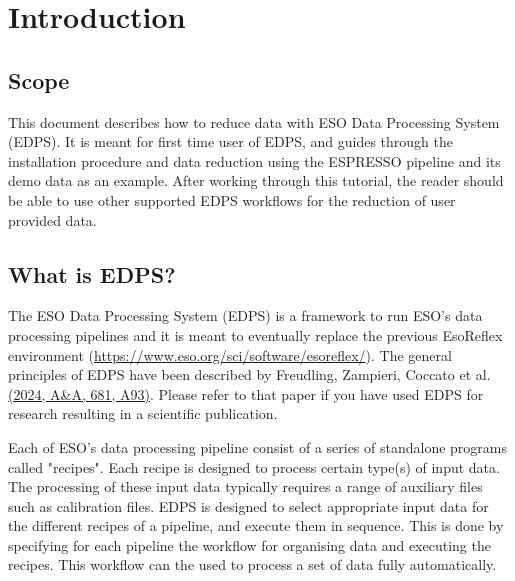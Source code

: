 \section{Introduction}
\subsection{Scope}

This document describes how to reduce data with ESO Data Processing System (EDPS). It is meant for first time user of EDPS, and guides through the installation procedure and data reduction using the ESPRESSO pipeline and its demo data as an example. After working through this tutorial, the reader should be able to use  other supported EDPS workflows for the reduction of user provided data.

\subsection{What is EDPS?}

The ESO Data Processing System (EDPS) is a framework  to  run ESO's data processing pipelines and it is meant to eventually replace the previous EsoReflex environment (\url{https://www.eso.org/sci/software/esoreflex/}). The general principles of EDPS have been described by Freudling, Zampieri, Coccato et al. \href{https://www.aanda.org/articles/aa/full_html/2024/01/aa47651-23/aa47651-23.html}{(2024, A\&A, 681, A93)}. Please refer to that paper if you have used EDPS for research resulting in a scientific publication. 

Each of ESO's data processing pipeline consist of a series of standalone programs called "recipes". Each recipe is designed to process certain type(s) of input data. The processing 
of these input data typically requires a range of auxiliary files such as calibration files. EDPS 
is designed to select appropriate input data for the different recipes of a pipeline, and execute 
them in sequence. This is done by specifying for each pipeline the workflow for organising data
and executing the recipes. This workflow can the used to process a set of data fully automatically. 


